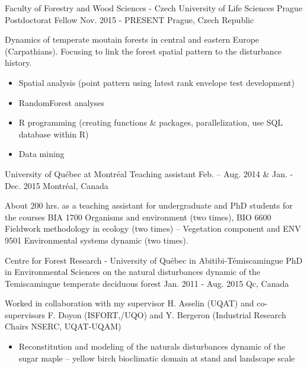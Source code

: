 \begin{cventries}
  \cventry
  {Faculty of Forestry and Wood Sciences - Czech University of Life Sciences Prague}
  {Postdoctorat Fellow}
  {Nov. 2015 - PRESENT}
    {Prague, Czech Republic}
{
    \begin{cvitems}
    \item []{\textnormal{Dynamics of temperate moutain forests in central and eastern Europe (Carpathians). Focusing to link the forest spatial pattern to the disturbance history.}}
      \begin{itemize}[label=$\bullet$,topsep=2pt]
      \item {Spatial analysis (point pattern using latest rank
          envelope test development)}
    \item {RandomForest analyses}
    \item {R programming (creating functions \& packages, parallelization, use SQL database within R)}
    \item {Data mining}
      \end{itemize}
      \end{cvitems}
  }
  \cventry
  {University of Québec at Montréal}
  {Teaching assistant}
  {Feb. – Aug. 2014 \& Jan. - Dec. 2015}
    {Montréal, Canada}
{
    \begin{cvitems}
    \item []{\textnormal{About 200 hrs. as a teaching assistant for undergraduate and PhD
          students for the courses BIA 1700 Organisms and environment
          (two times), BIO 6600 Fieldwork methodology in ecology (two
          times) – Vegetation component and ENV 9501 Environmental
          systems dynamic (two times).}}
    \end{cvitems}
  }
  \cventry
  {Centre for Forest Research - University of Québec in Abitibi-Témiscamingue}
  {PhD in Environmental Sciences on the natural disturbances dynamic
    of the Temiscamingue temperate deciduous forest}
  {Jan. 2011 - Aug. 2015}
    {Qc, Canada}
    {
      \begin{cvitems}
      \item []{\textnormal{Worked in collaboration with my supervisor
             H. Asselin (UQAT) and co-supervisors F.
            Doyon (ISFORT,/UQO) and Y. Bergeron (Industrial Research Chairs NSERC, UQAT-UQAM)}}
      \begin{itemize}[label=$\bullet$,topsep=2pt]
        \item {Reconstitution and modeling of the naturals disturbances dynamic of the sugar maple – yellow birch bioclimatic domain at stand and landscape scale}

\end{itemize}
\end{cvitems}}
\end{cventries}
